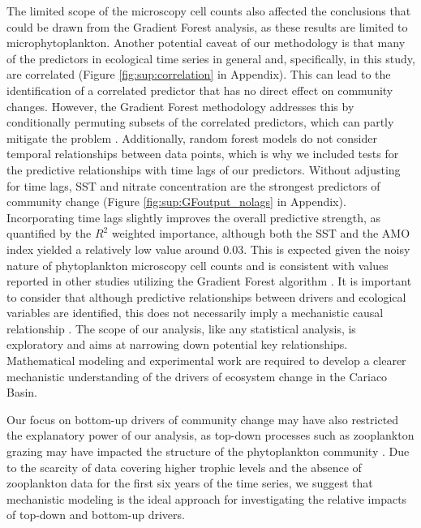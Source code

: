 \documentclass[draft]{agujournal2019}
\begin{document}
    
    The limited scope of the microscopy cell counts also affected the conclusions that could be drawn from the Gradient Forest analysis, as these results are limited to microphytoplankton. 
    Another potential caveat of our methodology is that many of the predictors in ecological time series in general and, specifically, in this study, are correlated (Figure \ref{fig:sup:correlation} in Appendix). This can lead to the identification of a correlated predictor that has no direct effect on community changes. However, the Gradient Forest methodology addresses this by conditionally permuting subsets of the correlated predictors, which can partly mitigate the problem \cite{ellis_gradient_2012}. Additionally, random forest models do not consider temporal relationships between data points, which is why we included tests for the predictive relationships with time lags of our predictors. Without adjusting for time lags, SST and nitrate concentration are the strongest predictors of community change (Figure \ref{fig:sup:GFoutput_nolags} in Appendix). Incorporating time lags slightly improves the overall predictive strength, as quantified by the $R^2$ weighted importance, although both the SST and the AMO index yielded a relatively low value around \qty{0.03}{}. This is expected given the noisy nature of phytoplankton microscopy cell counts and is consistent with values reported in other studies utilizing the Gradient Forest algorithm \cite{pitcher_example_2012, roland_pitcher_exploring_2012, roubeix_identification_2016, samhouri_defining_2017, fraker_temporal_2022}. It is important to consider that although predictive relationships between drivers and ecological variables are identified, this does not necessarily imply a mechanistic causal relationship . The scope of our analysis, like any statistical analysis, is exploratory and aims at narrowing down potential key relationships. Mathematical modeling and experimental work are required to develop a clearer mechanistic understanding of the drivers of ecosystem change in the Cariaco Basin.
     
    Our focus on bottom-up drivers of community change may have also restricted the explanatory power of our analysis, as top-down processes such as zooplankton grazing may have impacted the structure of the phytoplankton community \cite{frank_ups_2007, banas_adding_2011, acevedo-trejos_mechanisms_2015}. Due to the scarcity of data covering higher trophic levels and the absence of zooplankton data for the first six years of the time series, we suggest that mechanistic modeling is the ideal approach for investigating the relative impacts of top-down and bottom-up drivers.
    
\end{document}
